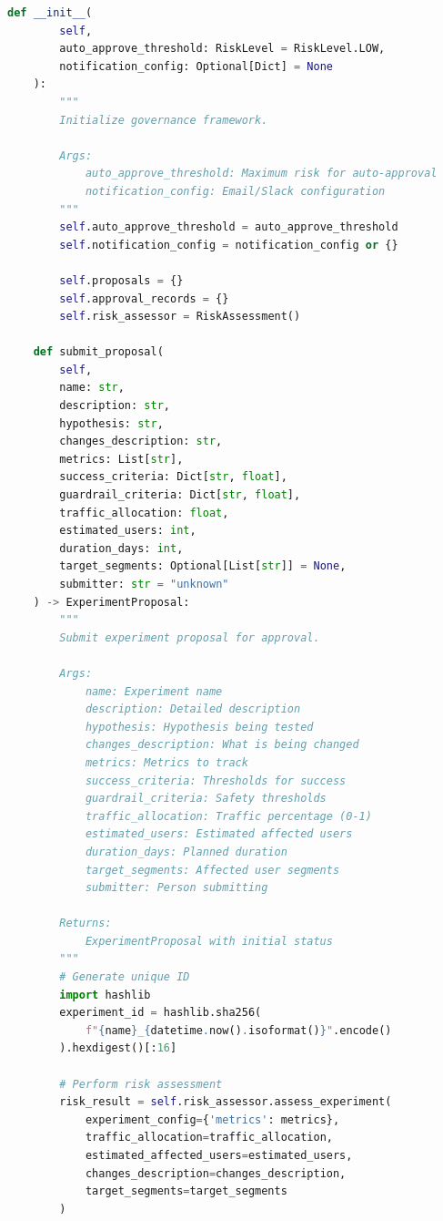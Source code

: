 \begin{lstlisting}[language=Python, caption={Experiment Governance and Approval Workflows}]
    def __init__(
        self,
        auto_approve_threshold: RiskLevel = RiskLevel.LOW,
        notification_config: Optional[Dict] = None
    ):
        """
        Initialize governance framework.

        Args:
            auto_approve_threshold: Maximum risk for auto-approval
            notification_config: Email/Slack configuration
        """
        self.auto_approve_threshold = auto_approve_threshold
        self.notification_config = notification_config or {}

        self.proposals = {}
        self.approval_records = {}
        self.risk_assessor = RiskAssessment()

    def submit_proposal(
        self,
        name: str,
        description: str,
        hypothesis: str,
        changes_description: str,
        metrics: List[str],
        success_criteria: Dict[str, float],
        guardrail_criteria: Dict[str, float],
        traffic_allocation: float,
        estimated_users: int,
        duration_days: int,
        target_segments: Optional[List[str]] = None,
        submitter: str = "unknown"
    ) -> ExperimentProposal:
        """
        Submit experiment proposal for approval.

        Args:
            name: Experiment name
            description: Detailed description
            hypothesis: Hypothesis being tested
            changes_description: What is being changed
            metrics: Metrics to track
            success_criteria: Thresholds for success
            guardrail_criteria: Safety thresholds
            traffic_allocation: Traffic percentage (0-1)
            estimated_users: Estimated affected users
            duration_days: Planned duration
            target_segments: Affected user segments
            submitter: Person submitting

        Returns:
            ExperimentProposal with initial status
        """
        # Generate unique ID
        import hashlib
        experiment_id = hashlib.sha256(
            f"{name}_{datetime.now().isoformat()}".encode()
        ).hexdigest()[:16]

        # Perform risk assessment
        risk_result = self.risk_assessor.assess_experiment(
            experiment_config={'metrics': metrics},
            traffic_allocation=traffic_allocation,
            estimated_affected_users=estimated_users,
            changes_description=changes_description,
            target_segments=target_segments
        )


\end{lstlisting}
